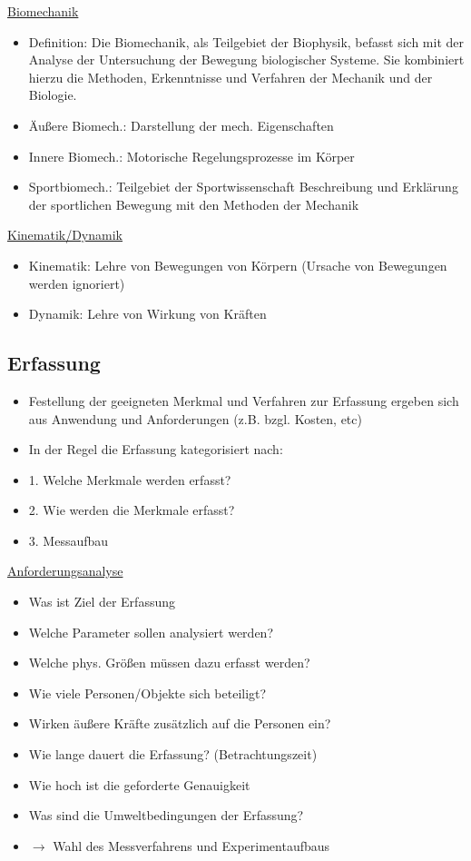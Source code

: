 \documentclass[a4paper,10pt,oneside]{article}
\begin{document}
\underline{Biomechanik} \\
	\begin{itemize}
		\item Definition: Die Biomechanik, als Teilgebiet der Biophysik, befasst sich mit der Analyse der Untersuchung der Bewegung biologischer Systeme. Sie kombiniert hierzu die Methoden, Erkenntnisse und Verfahren der Mechanik und der Biologie.
		\item Äußere Biomech.: Darstellung der mech. Eigenschaften
		\item Innere Biomech.: Motorische Regelungsprozesse im Körper
		\item Sportbiomech.: Teilgebiet der Sportwissenschaft Beschreibung und Erklärung der sportlichen Bewegung mit den Methoden der Mechanik
	\end{itemize}
	

\underline{Kinematik/Dynamik} \\
	\begin{itemize}
		\item
		 Kinematik: Lehre von Bewegungen von Körpern (Ursache von Bewegungen werden ignoriert)
		\item Dynamik: Lehre von Wirkung von Kräften
	\end{itemize}
 		
\subsection{Erfassung}
	\begin{itemize}
		\item Festellung der geeigneten Merkmal und Verfahren zur Erfassung ergeben sich aus Anwendung und Anforderungen (z.B. bzgl. Kosten, etc)
		\item In der Regel die Erfassung kategorisiert nach:
		\item 1. Welche Merkmale werden erfasst?
		\item 2. Wie werden die Merkmale erfasst?
		\item 3. Messaufbau
	\end{itemize}
 		

\underline{Anforderungsanalyse} \\
	\begin{itemize}
		\item Was ist Ziel der Erfassung
		\item Welche Parameter sollen analysiert werden?
		\item Welche phys. Größen müssen dazu erfasst werden?
		\item Wie viele Personen/Objekte sich beteiligt?
		\item Wirken äußere Kräfte zusätzlich auf die Personen ein?
		\item Wie lange dauert die Erfassung? (Betrachtungszeit)
		\item Wie hoch ist die geforderte Genauigkeit
		\item Was sind die Umweltbedingungen der Erfassung?
		\item $\rightarrow$ Wahl des Messverfahrens und Experimentaufbaus
	\end{itemize}
\end{document}
